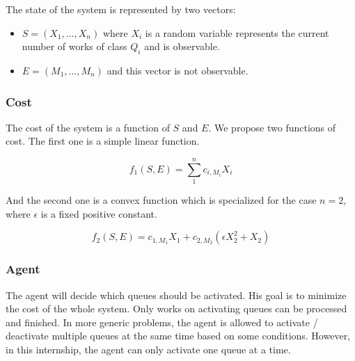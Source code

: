 \documentclass[
  a4paper, xcolor = usenames,dvipsnames]{article}
\providecommand{\tightlist}{%
  \setlength{\itemsep}{0pt}\setlength{\parskip}{0pt}}
\begin{document}
The state of the system is represented by two vectors:

\begin{itemize}
\tightlist
\item
  \(S = (X_{1}, \dots, X_{n})\) where \(X_{i}\) is a random variable represents the current number of works of class \(Q_{i}\) and is observable.
\item
  \(E = (M_{1}, \dots, M_{n})\) and this vector is not observable.
\end{itemize}

\hypertarget{cost}{%
\subsubsection{Cost}\label{cost}}

The cost of the system is a function of \(S\) and \(E\). We propose two functions of cost. The first one is a simple linear function.

\[
f_{1}(S, E) = \sum_{1}^{n} c_{i, M_{i}} X_{i}
\]

And the second one is a convex function which is specialized for the case \(n = 2\), where \(\epsilon\) is a fixed positive constant.

\[
f_{2}(S, E) = c_{1, M_{1}} X_{1} + c_{2, M_{2}} (\epsilon X_{2}^{2} + X_{2})
\]

\hypertarget{agent}{%
\subsubsection{Agent}\label{agent}}

The agent will decide which queues should be activated. His goal is to minimize the cost of the whole system. Only works on activating queues can be processed and finished. In more generic problems, the agent is allowed to activate / deactivate multiple queues at the same time based on some conditions. However, in this internship, the agent can only activate one queue at a time.
\end{document}
